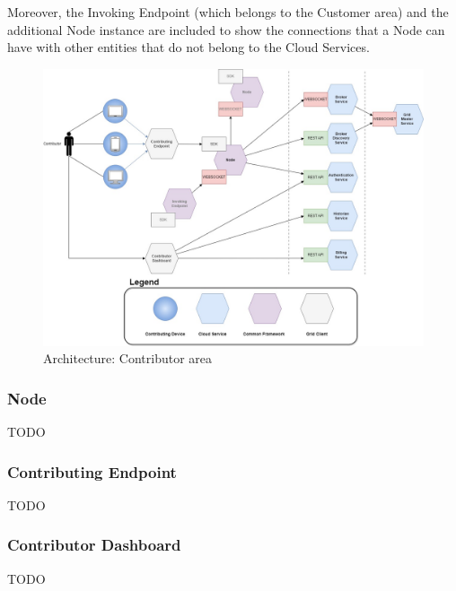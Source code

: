 Moreover, the Invoking Endpoint (which belongs to the Customer area) and the additional Node instance are included to show the connections that a Node can have with other entities that do not belong to the Cloud Services.

\vspace{5mm}

\begin{figure}[!ht]
    \centering
    \includegraphics[width=\linewidth]{document/chapters/chapter_6/images/architecture_contributor.jpg}
    \caption{Architecture: Contributor area}
    \label{fig:architecture_contributor}
\end{figure}

\subsubsection{Node}
TODO

\subsubsection{Contributing Endpoint}
TODO

\subsubsection{Contributor Dashboard}
TODO

